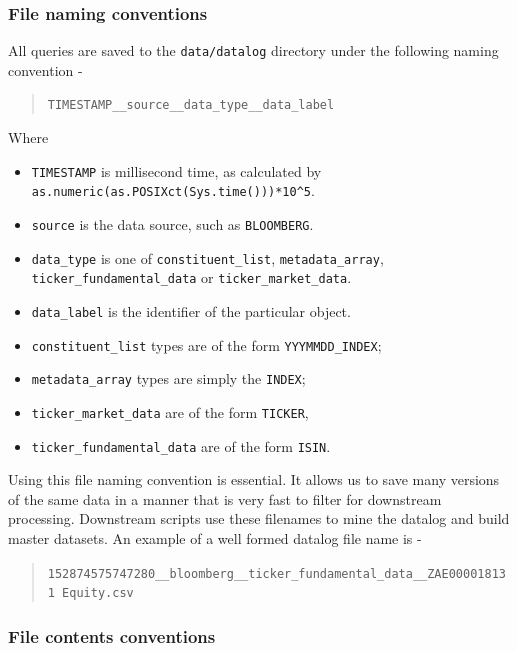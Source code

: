 \documentclass[11pt,preprint, authoryear]{elsarticle}
\numberwithin{equation}{section}
\numberwithin{figure}{section}
\numberwithin{table}{section}
\def\tightlist{} %
\begin{document}
\subsubsection{File naming conventions}\label{file-naming-conventions}

All queries are saved to the \texttt{data/datalog} directory under the
following naming convention -

\begin{quote}
\texttt{TIMESTAMP\_\_source\_\_data\_type\_\_data\_label}
\end{quote}

Where

\begin{itemize}
\tightlist
\item
  \texttt{TIMESTAMP} is millisecond time, as calculated by
  \texttt{as.numeric(as.POSIXct(Sys.time()))*10\^{}5}.
\item
  \texttt{source} is the data source, such as \texttt{BLOOMBERG}.
\item
  \texttt{data\_type} is one of \texttt{constituent\_list},
  \texttt{metadata\_array}, \texttt{ticker\_fundamental\_data} or
  \texttt{ticker\_market\_data}.
\item
  \texttt{data\_label} is the identifier of the particular object.
\item
  \texttt{constituent\_list} types are of the form
  \texttt{YYYMMDD\_INDEX};
\item
  \texttt{metadata\_array} types are simply the \texttt{INDEX};
\item
  \texttt{ticker\_market\_data} are of the form \texttt{TICKER},
\item
  \texttt{ticker\_fundamental\_data} are of the form \texttt{ISIN}.
\end{itemize}

Using this file naming convention is essential. It allows us to save
many versions of the same data in a manner that is very fast to filter
for downstream processing. Downstream scripts use these filenames to
mine the datalog and build master datasets. An example of a well formed
datalog file name is -

\begin{quote}
\texttt{152874575747280\_\_bloomberg\_\_ticker\_fundamental\_data\_\_ZAE000018131\ Equity.csv}
\end{quote}

\subsubsection{File contents
conventions}\label{file-contents-conventions}
\end{document}
